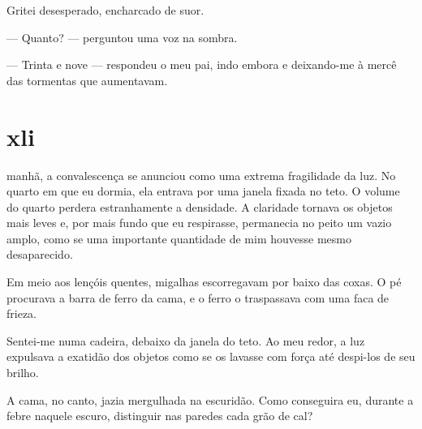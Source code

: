 

Gritei desesperado, encharcado de suor.

--- Quanto? --- perguntou uma voz na sombra.

--- Trinta e nove --- respondeu o meu pai, indo embora e deixando-me à mercê
    das tormentas que aumentavam.


\section{xli} 

 manhã, a convalescença se anunciou como uma extrema fragilidade
 da luz. No quarto em que eu dormia, ela entrava por uma janela fixada no
 teto. O volume do quarto perdera estranhamente a densidade. A claridade
 tornava os objetos mais leves e, por mais fundo que eu respirasse,
 permanecia no peito um vazio amplo, como se uma importante quantidade de mim
 houvesse mesmo desaparecido.

Em meio aos lençóis quentes, migalhas escorregavam por baixo das coxas. O pé
procurava a barra de ferro da cama, e o ferro o traspassava com uma faca de
frieza.


Sentei-me numa cadeira, debaixo da janela do teto. Ao meu redor, a luz
expulsava a exatidão dos objetos como se os lavasse com força até despi-los
de seu brilho.

A cama, no canto, jazia mergulhada na escuridão. Como conseguira eu, durante a
febre naquele escuro, distinguir nas paredes cada grão de cal?

